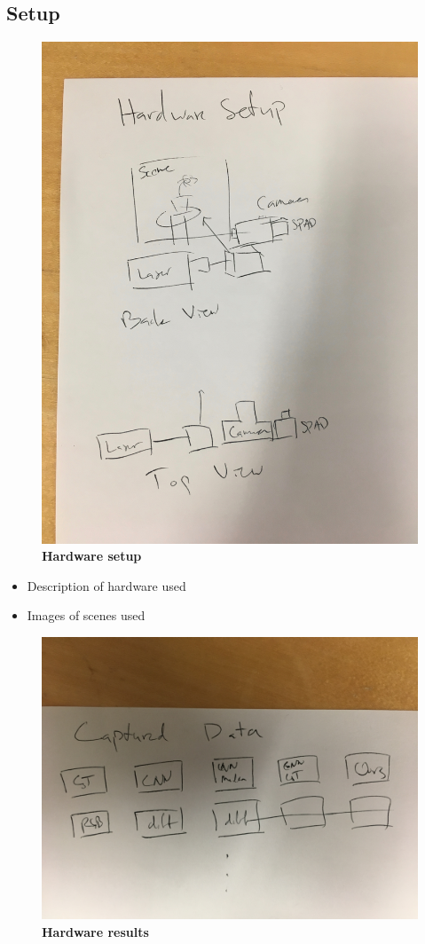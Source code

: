 
\subsection{Setup}
\begin{figure}
  \includegraphics[width=\textwidth/2]{sections/figures/hardware.jpeg}
  \caption{\textbf{Hardware setup}}
\end{figure}
\begin{itemize}
  \item{Description of hardware used}
  \item{Images of scenes used}
\end{itemize}
\begin{figure}
  \includegraphics[width=\textwidth/2]{sections/figures/hardware_results.jpeg}
  \caption{\textbf{Hardware results}}
\end{figure}